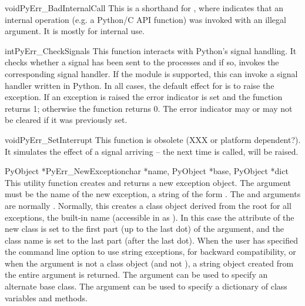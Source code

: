 \documentclass[twoside,openright]{report}
\begin{document}
\begin{cfuncdesc}{void}{PyErr_BadInternalCall}{}
This is a shorthand for , where  indicates that an internal
operation (e.g. a Python/C API function) was invoked with an illegal
argument.  It is mostly for internal use.
\end{cfuncdesc}

\begin{cfuncdesc}{int}{PyErr_CheckSignals}{}
This function interacts with Python's signal handling.  It checks
whether a signal has been sent to the processes and if so, invokes the
corresponding signal handler.  If the  module is
supported, this can invoke a signal handler written in Python.  In all
cases, the default effect for  is to raise the
 exception.  If an exception is raised the
error indicator is set and the function returns 1; otherwise the
function returns 0.  The error indicator may or may not be cleared if
it was previously set.
\end{cfuncdesc}

\begin{cfuncdesc}{void}{PyErr_SetInterrupt}{}
This function is obsolete (XXX or platform dependent?).  It simulates
the effect of a  signal arriving -- the next time
 is called,  will be
raised.
\end{cfuncdesc}

\begin{cfuncdesc}{PyObject *}{PyErr_NewException}{char *name,
PyObject *base, PyObject *dict}
This utility function creates and returns a new exception object.  The
 argument must be the name of the new exception, a \C{} string
of the form .  The  and 
arguments are normally \NULL{}.  Normally, this creates a class
object derived from the root for all exceptions, the built-in name
 (accessible in \C{} as ).  In this
case the  attribute of the new class is set to the
first part (up to the last dot) of the  argument, and the
class name is set to the last part (after the last dot).  When the
user has specified the  command line option to use string
exceptions, for backward compatibility, or when the 
argument is not a class object (and not \NULL{}), a string object
created from the entire  argument is returned.  The
 argument can be used to specify an alternate base class.
The  argument can be used to specify a dictionary of class
variables and methods.
\end{cfuncdesc}
\end{document}
